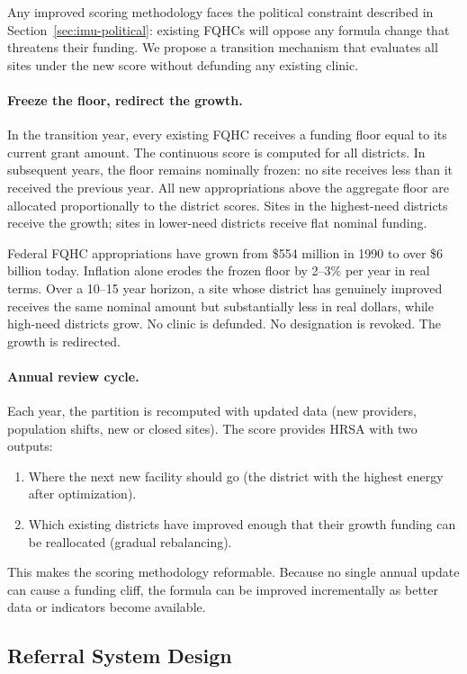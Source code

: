 \documentclass[11pt]{article}
\begin{document}
Any improved scoring methodology faces the political constraint described in
Section~\ref{sec:imu-political}: existing FQHCs will oppose any formula change
that threatens their funding. We propose a transition mechanism that evaluates
all sites under the new score without defunding any existing clinic.

\paragraph{Freeze the floor, redirect the growth.}
In the transition year, every existing FQHC receives a funding floor equal to
its current grant amount. The continuous score is computed for all districts.
In subsequent years, the floor remains nominally frozen: no site receives less
than it received the previous year. All new appropriations above the aggregate
floor are allocated proportionally to the district scores. Sites in the
highest-need districts receive the growth; sites in lower-need districts
receive flat nominal funding.

Federal FQHC appropriations have grown from \$554 million in 1990 to over
\$6 billion today. Inflation alone erodes the frozen floor by 2--3\% per year
in real terms. Over a 10--15 year horizon, a site whose district has genuinely
improved receives the same nominal amount but substantially less in real
dollars, while high-need districts grow. No clinic is defunded. No
designation is revoked. The growth is redirected.

\paragraph{Annual review cycle.}
Each year, the partition is recomputed with updated data (new providers,
population shifts, new or closed sites). The score provides HRSA with two
outputs:
\begin{enumerate}
  \item Where the next new facility should go (the district with the highest
    energy after optimization).
  \item Which existing districts have improved enough that their growth
    funding can be reallocated (gradual rebalancing).
\end{enumerate}
This makes the scoring methodology reformable. Because no single annual update
can cause a funding cliff, the formula can be improved incrementally as better
data or indicators become available.


\subsection{Referral System Design}
\end{document}

